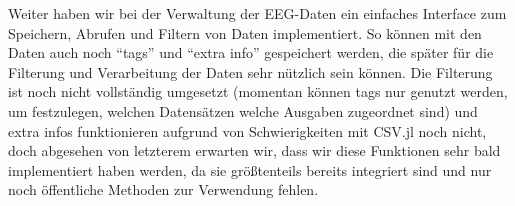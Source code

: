 \documentclass[10pt]{article}
\begin{document}
Weiter haben wir bei der Verwaltung der EEG-Daten ein einfaches Interface zum Speichern, Abrufen und Filtern von Daten implementiert.
So können mit den Daten auch noch \enquote{tags} und \enquote{extra info} gespeichert werden, die später für die Filterung und Verarbeitung der Daten sehr nützlich sein können.
Die Filterung ist noch nicht vollständig umgesetzt (momentan können tags nur genutzt werden, um festzulegen, welchen Datensätzen welche Ausgaben zugeordnet sind) und extra infos funktionieren aufgrund von Schwierigkeiten mit CSV.jl noch nicht, doch abgesehen von letzterem erwarten wir, dass wir diese Funktionen sehr bald implementiert haben werden, da sie größtenteils bereits integriert sind und nur noch öffentliche Methoden zur Verwendung fehlen.




\end{document}
